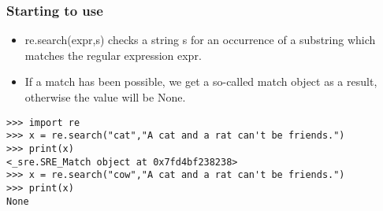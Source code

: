  \begin{frame}[fragile]
\frametitle{Starting to use}

\begin{itemize}
\item re.search(expr,s) checks a string s for an occurrence of a substring which matches the regular expression expr.
\item If a match has been possible, we get a so-called match object as a result, otherwise the value will be None.
\end{itemize}

\begin{lstlisting}
>>> import re
>>> x = re.search("cat","A cat and a rat can't be friends.")
>>> print(x)
<_sre.SRE_Match object at 0x7fd4bf238238>
>>> x = re.search("cow","A cat and a rat can't be friends.")
>>> print(x)
None
\end{lstlisting}

\end{frame}

